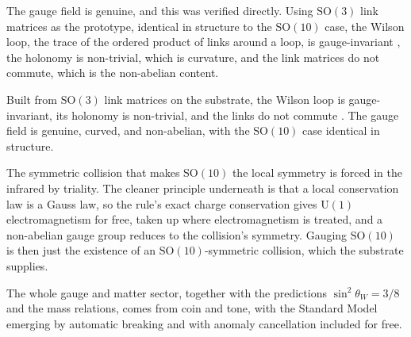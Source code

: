 The gauge field is genuine, and this was verified directly. Using $\mathrm{SO}(3)$ link matrices as the
prototype, identical in structure to the $\mathrm{SO}(10)$ case, the Wilson loop, the trace of the
ordered product of links around a loop, is gauge-invariant \cite{wilson1974}, the holonomy is non-trivial, which
is curvature, and the link matrices do not commute, which is the non-abelian content.

\begin{result}
Built from $\mathrm{SO}(3)$ link matrices on the substrate, the Wilson loop is gauge-invariant, its holonomy is
non-trivial, and the links do not commute \cite{pollard2026vibetest}. The gauge field is genuine, curved, and
non-abelian, with the $\mathrm{SO}(10)$ case identical in structure.
\end{result}

The symmetric collision that makes $\mathrm{SO}(10)$ the local symmetry is forced in the infrared by triality.
The cleaner principle underneath is that a local conservation law is a Gauss law, so the rule's exact charge
conservation gives $\mathrm{U}(1)$ electromagnetism for free, taken up where electromagnetism is treated, and a
non-abelian gauge group reduces to the collision's symmetry. Gauging $\mathrm{SO}(10)$ is then just the existence
of an $\mathrm{SO}(10)$-symmetric collision, which the substrate supplies.


The whole gauge and matter sector, together with the predictions $\sin^2\theta_W = 3/8$ and the mass relations,
comes from coin and tone, with the Standard Model emerging by automatic breaking and with anomaly cancellation
included for free.
